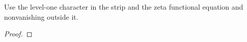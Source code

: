 \begin{theorem}
\label{zeta}
\leanok
Use the level-one character in the strip and the zeta functional equation and nonvanishing outside it.
\end{theorem}
\begin{proof}
\leanok
\end{proof}
